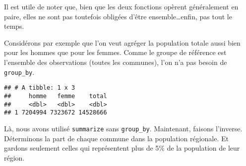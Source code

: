\documentclass[]{book}
\newenvironment{Shaded}{\begin{snugshade}}{\end{snugshade}}
\newcommand{\KeywordTok}[1]{\textcolor[rgb]{0.13,0.29,0.53}{\textbf{#1}}}
\newcommand{\DataTypeTok}[1]{\textcolor[rgb]{0.13,0.29,0.53}{#1}}
\newcommand{\DecValTok}[1]{\textcolor[rgb]{0.00,0.00,0.81}{#1}}
\newcommand{\StringTok}[1]{\textcolor[rgb]{0.31,0.60,0.02}{#1}}
\newcommand{\CommentTok}[1]{\textcolor[rgb]{0.56,0.35,0.01}{\textit{#1}}}
\newcommand{\OperatorTok}[1]{\textcolor[rgb]{0.81,0.36,0.00}{\textbf{#1}}}
\newcommand{\NormalTok}[1]{#1}
\begin{document}
Il est utile de noter que, bien que les deux fonctions opèrent
généralement en paire, elles ne sont pas toutefois obligées d'être
ensemble\ldots{}enfin, pas tout le temps.

Considérons par exemple que l'on veut agréger la population totale aussi
bien pour les hommes que pour les femmes. Comme le groupe de référence
est l'ensemble des observations (toutes les communes), l'on n'a pas
besoin de \texttt{group\_by}.

\begin{Shaded}
\end{Shaded}

\begin{verbatim}
## # A tibble: 1 x 3
##     homme   femme    total
##     <dbl>   <dbl>    <dbl>
## 1 7204994 7323672 14528666
\end{verbatim}

Là, nous avons utilisé \texttt{summarize} sans \texttt{group\_by}.
Maintenant, faisons l'inverse. Déterminons la part de chaque commune
dans la population régionale. Et gardons seulement celles qui
représentent plus de 5\% de la population de leur région.
\end{document}
